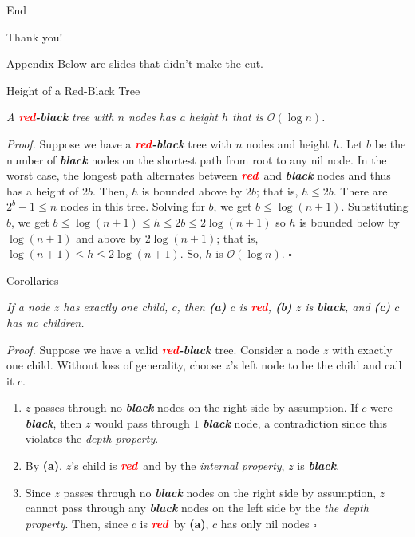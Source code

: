 \documentclass[aspectratio=169]{beamer}
\newcommand{\textib}[1]{\textit{\textbf{{#1}}}}
\newcommand{\red}{\textib{\textcolor{red}{red}}}
\newcommand{\proposition}[1]{\begin{tcolorbox}[title={Proposition}]\small{\textit{{#1}}}\end{tcolorbox}}
\newcommand{\thm}[1]{\begin{tcolorbox}[title={Theorem}]\small{\textit{{#1}}}\end{tcolorbox}}
\begin{document}
\begin{frame}{End}
    \begin{center}
        Thank you!
    \end{center}
\end{frame}


\begin{frame}{Appendix}
    Below are slides that didn't make the cut.
\end{frame}


\begin{frame}{Height of a Red-Black Tree}
    \thm{
        A \red\textib{-black} tree with $n$ nodes has a height $h$ that is $\mathcal{O} (\log n)$.
    }
    \textit{Proof.}
    Suppose we have a \red\textib{-black} tree with $n$ nodes and height $h$. Let $b$ be the number
    of \textib{black} nodes on the shortest path from root to any nil node. In the worst case, the
    longest path alternates between \red \ and \textib{black} nodes and thus has a height of $2b$.
    Then, $h$ is bounded above by $2b$; that is, $h \leq 2b$. There are $2^b - 1 \leq n$ nodes in
    this tree. Solving for $b$, we get $b \leq \log(n + 1)$. Substituting $b$, we get
    $b \leq \log(n + 1) \leq h \leq 2b \leq 2\log(n + 1)$ so $h$ is bounded below by $\log(n + 1)$
    and above by $2\log(n + 1)$; that is, $\log(n + 1) \leq h \leq 2\log(n + 1)$. So, $h$ is
    $\mathcal{O} (\log n)$. \hfill $\square$
\end{frame}


\begin{frame}{Corollaries}
    \proposition{
        If a node $z$ has exactly one child, $c$, then
        \textnormal{\textbf{(a)}} $c$ is \red,
        \textnormal{\textbf{(b)}} $z$ is \textib{black}, and
        \textnormal{\textbf{(c)}} $c$ has no children.
    }
    \textit{Proof.}
    Suppose we have a valid \red\textib{-black} tree. Consider a node $z$ with exactly one child.
    Without loss of generality, choose $z$'s left node to be the child and call it $c$.
    \begin{enumerate}[label=\textbf{(\alph*)}]
        \item $z$ passes through no \textib{black} nodes on the right side by assumption. If $c$ were
            \textib{black}, then $z$ would pass through $1$ \textib{black} node, a contradiction
            since this violates the \textit{depth property}.
        \item By \textbf{(a)}, $z$'s child is \red \ and by the \textit{internal property}, $z$ is \textib{black}.
        \item Since $z$ passes through no \textib{black} nodes on the right side by assumption,
            $z$ cannot pass through any \textib{black} nodes on the left side by the \textit{the depth
            property}. Then, since $c$ is \red \ by \textbf{(a)}, $c$ has only nil nodes \hfill $\square$
    \end{enumerate}
\end{frame}
\end{document}
